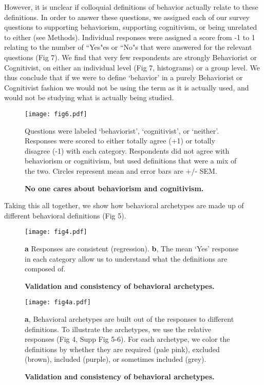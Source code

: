 \documentclass[a4paper, 11pt]{article}
\begin{document}
However, it is unclear if colloquial definitions of behavior actually relate to these definitions. In order to answer these questions, we assigned each of our survey questions to supporting behaviorism, supporting cognitivism, or being unrelated to either (see Methods). Individual responses were assigned a score from -1 to 1 relating to the number of ``Yes"es or ``No"s that were answered for the relevant questions (Fig 7). We find that very few respondents are strongly Behaviorist or Cognitivist, on either an individual level (Fig 7, histograms) or a group level. We thus conclude that if we were to define `behavior' in a purely Behaviorist or Cognitivist fashion we would not be using the term as it is actually used, and would not be studying what is actually being studied.

\begin{figure}
\centerline{\texttt{[image: fig6.pdf]}}
\caption{\textbf{No one cares about behaviorism and cognitivism.}} Questions were labeled `behaviorist', `cognitivist', or `neither'. Responses were scored to either totally agree (+1) or totally disagree (-1) with each category. Respondents did not agree with behaviorism or cognitivism, but used definitions that were a mix of the two. Circles represent mean and error bars are +/- SEM.
\end{figure}

Taking this all together, we show how behavioral archetypes are made up of different behavioral definitions (Fig 5).

\begin{figure}
\centerline{\texttt{[image: fig4.pdf]}}
\caption{\textbf{Validation and consistency of behavioral archetypes.}} \textbf{a} Responses are consistent (regression). \textbf{b}, The mean `Yes' response in each category allow us to understand what the definitions are composed of.
\end{figure}

\begin{figure}
\centerline{\texttt{[image: fig4a.pdf]}}
\caption{\textbf{Validation and consistency of behavioral archetypes.}} \textbf{a}, Behavioral archetypes are built out of the responses to different definitions. To illustrate the archetypes, we use the relative responses (Fig 4, Supp Fig 5-6). For each archetype, we color the definitions by whether they are required (pale pink), excluded (brown), included (purple), or sometimes included (grey).
\end{figure}
\end{document}
